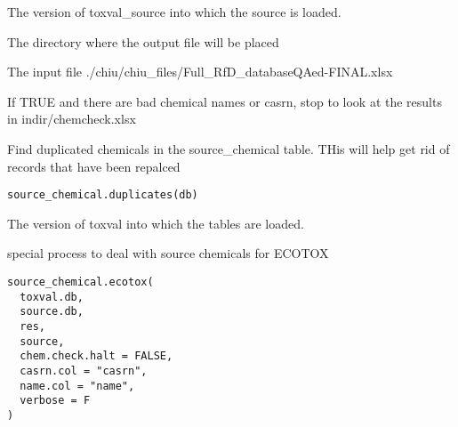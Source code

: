 \documentclass[letterpaper]{book}
\begin{document}
\begin{Arguments}
\begin{ldescription}
\item[\code{db}] The version of toxval\_source into which the source is loaded.

\item[\code{indir}] The directory where the output file will be placed

\item[\code{infile}] The input file ./chiu/chiu\_files/Full\_RfD\_databaseQAed-FINAL.xlsx

\item[\code{chem.chek.halt}] If TRUE and there are bad chemical names or casrn,
stop to look at the results in indir/chemcheck.xlsx
\end{ldescription}
\end{Arguments}
%
\begin{Description}\relax
Find duplicated chemicals in the source\_chemical table. THis will help get rid of
records that have been repalced
\end{Description}
%
\begin{Usage}
\begin{verbatim}
source_chemical.duplicates(db)
\end{verbatim}
\end{Usage}
%
\begin{Arguments}
\begin{ldescription}
\item[\code{db}] The version of toxval into which the tables are loaded.
\end{ldescription}
\end{Arguments}
%
\begin{Description}\relax
special process to deal with source chemicals for ECOTOX
\end{Description}
%
\begin{Usage}
\begin{verbatim}
source_chemical.ecotox(
  toxval.db,
  source.db,
  res,
  source,
  chem.check.halt = FALSE,
  casrn.col = "casrn",
  name.col = "name",
  verbose = F
)
\end{verbatim}
\end{Usage}
\end{document}
